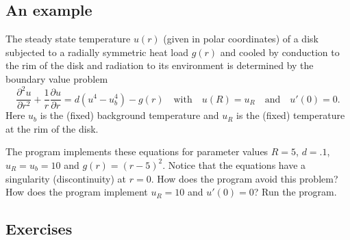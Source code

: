 
\subsection*{An example}

The steady state temperature $u(r)$ (given in polar coordinates)
of a disk subjected to a radially symmetric heat load
$g(r)$ and cooled by conduction to the rim of the disk and radiation
to  its environment is determined
by the boundary value problem
\begin{equation}\label{heatdiskeqn}
\frac{\partial^2 u}{\partial r^2}+ \frac{1}{r} \frac{\partial u}{\partial r}
= d (u^4 - u_b^4) - g(r)
\quad\text{with}\quad u(R) = u_R
\quad\text{and}\quad u'(0) = 0.
\end{equation}
Here $u_b$ is the (fixed) background temperature and  $u_R$ is the (fixed) temperature
at the rim of the disk.


The program  implements
these equations for parameter values $R = 5$, $d = .1$, $u_R = u_b = 10$ and
$g(r) = (r-5)^2$. Notice that the equations have a singularity (discontinuity) at $r=0$.
How does the program avoid this problem? How does the program implement $u_R=10$ and
$u'(0) = 0$? Run the program.





\subsection*{Exercises}

